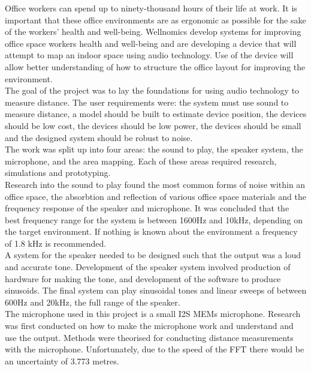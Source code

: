 Office workers can spend up to ninety-thousand hours of their life at work. It is important that these office environments are as ergonomic as possible for the sake of the workers’ health and well-being. Wellnomics develop systems for improving office space workers health and well-being and are developing a device that will attempt to map an indoor space using audio technology. Use of the device will allow better understanding of how to structure the office layout for improving the environment. \\

The goal of the project was to lay the foundations for using audio technology to measure distance. The user requirements were: the system must use sound to measure distance, a model should be built to estimate device position, the devices should be low cost, the devices should be low power, the devices should be small and the designed system should be robust to noise. \\

The work was split up into four areas: the sound to play, the speaker system, the microphone, and the area mapping. Each of these areas required research, simulations and prototyping. \\

Research into the sound to play found the most common forms of noise within an office space, the absorbtion and reflection of various office space materials and the frequency response of the speaker and microphone. It was concluded that the best frequency range for the system is between 1600Hz and 10kHz, depending on the target environment. If nothing is known about the environment a frequency of 1.8 kHz is recommended. \\

A system for the speaker needed to be designed such that the output was a loud and accurate tone. Development of the speaker system involved production of hardware for making the tone, and development of the software to produce sinusoids. The final system can play sinusoidal tones and linear sweeps of between 600Hz and 20kHz, the full range of the speaker. \\

The microphone used in this project is a small I2S MEMs microphone. Research was first conducted on how to make the microphone work and understand and use the output. Methods were theorised for conducting distance measurements with the microphone. Unfortunately, due to the speed of the FFT there would be an uncertainty of 3.773 metres. \\

